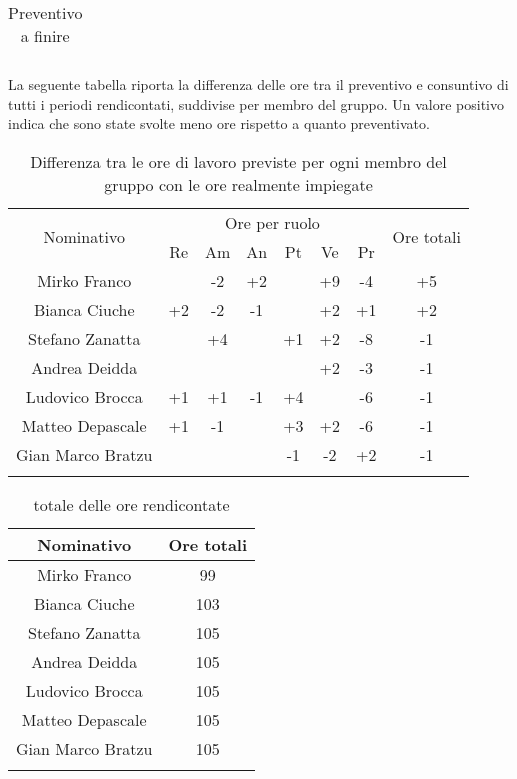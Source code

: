 \begin{flushleft}
\begin{table}[H]
\begin{center}
\begin{tabular}{ccc}
			\end{tabular}
			\caption{Preventivo a finire} 
		\end{center}		
	\end{table}
	La seguente tabella riporta la differenza delle ore tra il preventivo e consuntivo di tutti i periodi rendicontati, suddivise per membro del gruppo. Un valore positivo indica che sono state svolte meno ore rispetto a quanto preventivato.
	\begin{longtable}{|c|cccccc|c|}
				\hline
				\multirow{2}{*}{Nominativo} & \multicolumn{6}{c|}{Ore per ruolo} & \multirow{2}{*}{Ore totali} \\ \cline{2-7}
				& Re & Am & An & Pt & Ve & Pr &      \\ \hline
				\endhead
				Mirko Franco       &    & -2 & +2 &    & +9 & -4 & +5  \\ \hline
				Bianca Ciuche      & +2 & -2 & -1 &    & +2 & +1 & +2   \\ \hline
				Stefano Zanatta    &    & +4 &    & +1 & +2 & -8 & -1   \\ \hline
				Andrea Deidda      &    &    &    &    & +2 & -3 & -1  		\\ \hline
				Ludovico Brocca    & +1 & +1 & -1 & +4 &    & -6 & -1      \\ \hline
				Matteo Depascale   & +1 & -1 &    & +3 & +2 & -6 & -1	   \\ \hline
				Gian Marco Bratzu  &    &    &    & -1 & -2 & +2 & -1    \\ \hline
				
			\caption{Differenza tra le ore di lavoro previste per ogni membro del gruppo con le ore realmente impiegate }
	\end{longtable}

	\begin{longtable}{|c|c|}
		\hline
		\textbf{Nominativo} & \textbf{Ore totali} \\ \hline
		\endhead  
		Mirko Franco       &  99     \\ \hline
		Bianca Ciuche      &  103         \\ \hline
		Stefano Zanatta    &  105      \\ \hline
		Andrea Deidda      &  105  		\\ \hline
		Ludovico Brocca    &  105    \\ \hline
		Matteo Depascale   & 	105	\\ \hline
		Gian Marco Bratzu  &  105     \\ \hline
	
	\caption{totale delle ore rendicontate}
\end{longtable}
\end{flushleft}